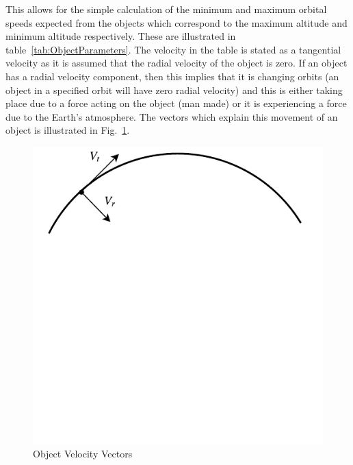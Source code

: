 \documentclass[11pt]{witseiepaper}
\begin{document}
\begin{bibunit}[witseie]
This allows for the simple calculation of the minimum and maximum orbital speeds expected from the objects which correspond to the maximum altitude and minimum altitude respectively. These are illustrated in table~\ref{tab:ObjectParameters}. The velocity in the table is stated as a tangential velocity as it is assumed that the radial velocity of the object is zero. If an object has a radial velocity component, then this implies that it is changing orbits (an object in a specified orbit will have zero radial velocity) and this is either taking place due to a force acting on the object (man made) or it is experiencing a force due to the Earth's atmosphere. The vectors which explain this movement of an object is illustrated in Fig.~\ref{fig:ObjectVelocityVectors}.

\begin{figure}[htb]
\centering
\includegraphics[width=0.5\linewidth]{Vectors.pdf}
\caption{Object Velocity Vectors}
\label{fig:ObjectVelocityVectors}
\end{figure}





\end{bibunit}
\end{document}
